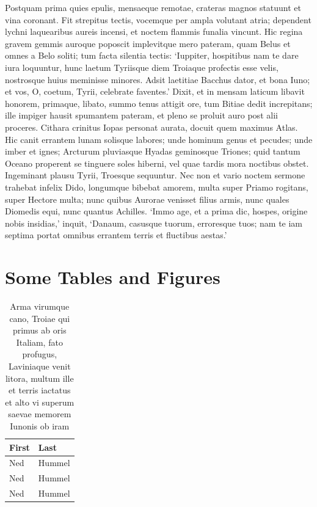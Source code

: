 \documentclass{article}
\begin{document}
Postquam prima quies epulis, mensaeque remotae, crateras magnos
statuunt et vina coronant.  Fit strepitus tectis, vocemque per ampla
volutant atria; dependent lychni laquearibus aureis incensi, et noctem
flammis funalia vincunt.  Hic regina gravem gemmis auroque poposcit
implevitque mero pateram, quam Belus et omnes a Belo soliti; tum facta
silentia tectis: `Iuppiter, hospitibus nam te dare iura loquuntur,
hunc laetum Tyriisque diem Troiaque profectis esse velis, nostrosque
huius meminisse minores.  Adsit laetitiae Bacchus dator, et bona Iuno;
et vos, O, coetum, Tyrii, celebrate faventes.'  Dixit, et in mensam
laticum libavit honorem, primaque, libato, summo tenus attigit ore,
tum Bitiae dedit increpitans; ille impiger hausit spumantem pateram,
et pleno se proluit auro post alii proceres.  Cithara crinitus Iopas
personat aurata, docuit quem maximus Atlas.  Hic canit errantem lunam
solisque labores; unde hominum genus et pecudes; unde imber et ignes;
Arcturum pluviasque Hyadas geminosque Triones; quid tantum Oceano
properent se tinguere soles hiberni, vel quae tardis mora noctibus
obstet.  Ingeminant plausu Tyrii, Troesque sequuntur.  Nec non et
vario noctem sermone trahebat infelix Dido, longumque bibebat amorem,
multa super Priamo rogitans, super Hectore multa; nunc quibus Aurorae
venisset filius armis, nunc quales Diomedis equi, nunc quantus
Achilles.  `Immo age, et a prima dic, hospes, origine nobis insidias,'
inquit, `Danaum, casusque tuorum, erroresque tuos; nam te iam septima
portat omnibus errantem terris et fluctibus aestas.'\cite{virgil}

\chapter{Some Tables and Figures}

\begin{table}[h]
  \centering
  \begin{tabular}{ll}\toprule
    First & Last \\ \midrule
    Ned & Hummel \\
    Ned & Hummel \\
    Ned & Hummel \\ \bottomrule
  \end{tabular}
  \caption{Arma virumque cano, Troiae qui primus ab oris Italiam, fato profugus,
Laviniaque venit litora, multum ille et terris iactatus et alto vi
superum saevae memorem Iunonis ob iram}
  \label{tab:tabular}
\end{table}
\end{document}
